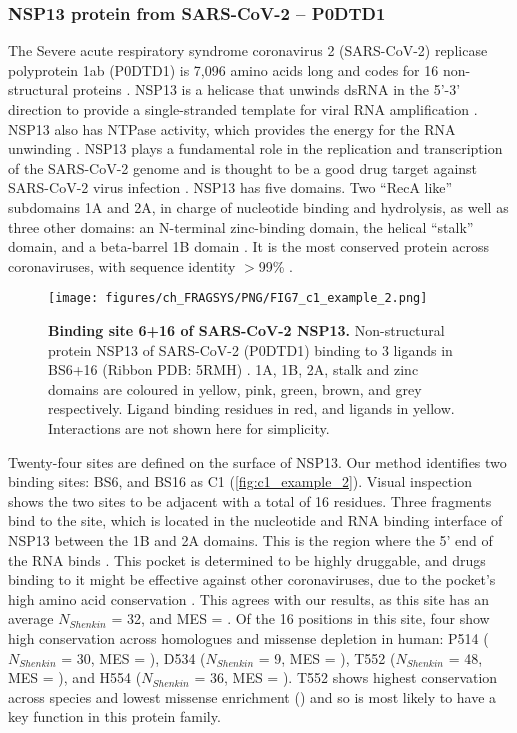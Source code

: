 \subsubsection{NSP13 protein from SARS-CoV-2 -- P0DTD1}

The Severe acute respiratory syndrome coronavirus 2 (SARS-CoV-2) replicase polyprotein 1ab (P0DTD1) is 7,096 amino acids long and codes for 16 non-structural proteins \cite{NAQVI_2020_SARSCOV2}. NSP13 is a helicase that unwinds dsRNA in the 5’-3’ direction to provide a single-stranded template for viral RNA amplification \cite{YUE_2022_SARSCOV2}. NSP13 also has NTPase activity, which provides the energy for the RNA unwinding \cite{SHU_2020_SARSCOV2}. NSP13 plays a fundamental role in the replication and transcription of the SARS-CoV-2 genome and is thought to be a good drug target against SARS-CoV-2 virus infection \cite{ZENG_2021_SARSCOV2}. NSP13 has five domains. Two ``RecA like'' subdomains 1A and 2A, in charge of nucleotide binding and hydrolysis, as well as three other domains: an N-terminal zinc-binding domain, the helical ``stalk'' domain, and a beta-barrel 1B domain \cite{ROMEO_2022_SARSCOV2}. It is the most conserved protein across coronaviruses, with sequence identity $>$99\% \cite{RICCI_2022_SARSCOV2}.

\begin{figure}[htb!]
    \centering
    \texttt{[image: figures/ch\_FRAGSYS/PNG/FIG7\_c1\_example\_2.png]}
    \caption[Binding site 6+16 of SARS-CoV-2 NSP13]{\textbf{Binding site 6+16 of SARS-CoV-2 NSP13.} Non-structural protein NSP13 of SARS-CoV-2 (P0DTD1) binding to 3 ligands in BS6+16 (Ribbon PDB: 5RMH) \cite{NEWMAN_2021_SARSCOV2}. 1A, 1B, 2A, stalk and zinc domains are coloured in yellow, pink, green, brown, and grey respectively. Ligand binding residues in red, and ligands in yellow. Interactions are not shown here for simplicity.}
    \label{fig:c1_example_2}
\end{figure}

Twenty-four sites are defined on the surface of NSP13. Our method identifies two binding sites: BS6, and BS16 as C1 (\autoref{fig:c1_example_2}). Visual inspection shows the two sites to be adjacent with a total of 16 residues. Three fragments bind to the site, which is located in the nucleotide and RNA binding interface of NSP13 between the 1B and 2A domains. This is the region where the 5’ end of the RNA binds \cite{YAN_2020_SARSCOV2}. This pocket is determined to be highly druggable, and drugs binding to it might be effective against other coronaviruses, due to the pocket’s high amino acid conservation \cite{NEWMAN_2021_SARSCOV2}. This agrees with our results, as this site has an average $N_{Shenkin}$ = 32, and MES = . Of the 16 positions in this site, four show high conservation across homologues and missense depletion in human: P514 ($N_{Shenkin}$ = 30, MES = ), D534 ($N_{Shenkin}$ = 9, MES = ), T552 ($N_{Shenkin}$ = 48, MES = ), and H554 ($N_{Shenkin}$ = 36, MES = ). T552 shows highest conservation across species and lowest missense enrichment () and so is most likely to have a key function in this protein family.

